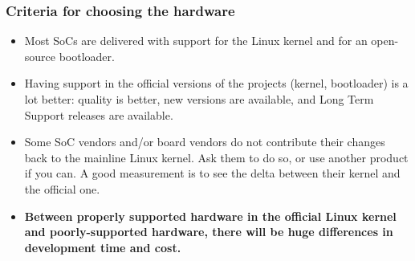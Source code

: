 %

\begin{frame}
  \frametitle{Criteria for choosing the hardware}
  \begin{itemize}
  \item Most SoCs are delivered with support for the Linux kernel
    and for an open-source bootloader.
  \item Having support in the official versions of the projects
    (kernel, bootloader) is a lot better: quality is better, new
    versions are available, and Long Term Support releases are
    available.
  \item Some SoC vendors and/or board vendors do not contribute their
    changes back to the mainline Linux kernel. Ask them to do so, or
    use another product if you can. A good measurement is to see the
    delta between their kernel and the official one.
  \item {\bf Between properly supported hardware in the official Linux
      kernel and poorly-supported hardware, there will be huge
      differences in development time and cost.}
  \end{itemize}
\end{frame}


